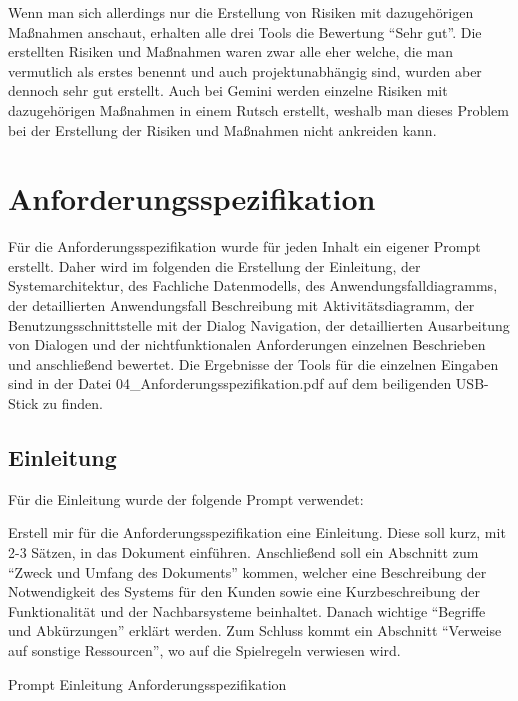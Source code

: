 Wenn man sich allerdings nur die Erstellung von Risiken mit dazugehörigen Maßnahmen anschaut, erhalten alle drei 
Tools die Bewertung ``Sehr gut''. Die erstellten Risiken und Maßnahmen waren zwar alle eher welche, die man vermutlich 
als erstes benennt und auch projektunabhängig sind, wurden aber dennoch sehr gut erstellt. Auch bei Gemini werden 
einzelne Risiken mit dazugehörigen Maßnahmen in einem Rutsch erstellt, weshalb man dieses Problem bei der Erstellung 
der Risiken und Maßnahmen nicht ankreiden kann.

\section{Anforderungsspezifikation}  \label{CompAnforderungsspezifikation}

Für die Anforderungsspezifikation wurde für jeden Inhalt ein eigener Prompt erstellt. Daher wird im folgenden die Erstellung der Einleitung, 
der Systemarchitektur, des Fachliche Datenmodells, des Anwendungsfalldiagramms, der detaillierten Anwendungsfall Beschreibung mit Aktivitätsdiagramm, 
der Benutzungsschnittstelle mit der Dialog Navigation, der detaillierten Ausarbeitung von Dialogen und der nichtfunktionalen Anforderungen einzelnen
Beschrieben und anschließend bewertet. Die Ergebnisse der Tools für die einzelnen Eingaben sind in der Datei 04\_Anforderungsspezifikation.pdf auf 
dem beiligenden USB-Stick zu finden.

\subsection*{Einleitung}

Für die Einleitung wurde der folgende Prompt verwendet:

\begin{prompt}[H]
    \begin{tcolorbox}[colback=gray!20, colframe=gray!20, boxrule=0pt, sharp corners] 
        Erstell mir für die Anforderungsspezifikation eine Einleitung. Diese soll kurz, mit 2-3 Sätzen, in das Dokument einführen. Anschließend soll 
        ein Abschnitt zum ``Zweck und Umfang des Dokuments'' kommen, welcher eine Beschreibung der Notwendigkeit des Systems für den Kunden sowie eine 
        Kurzbeschreibung der Funktionalität und der Nachbarsysteme beinhaltet. Danach wichtige ``Begriffe und Abkürzungen'' erklärt werden. Zum Schluss 
        kommt ein Abschnitt ``Verweise auf sonstige Ressourcen'', wo auf die Spielregeln verwiesen wird.
        \vfill
    \end{tcolorbox}
    \caption{Prompt Einleitung Anforderungsspezifikation}
    \label{Prompt Einleitung Anforderungsspezifikation}
\end{prompt}

